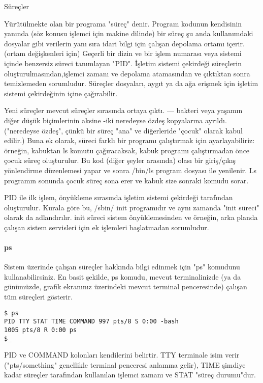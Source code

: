 \begin{section}{Süreçler}

Yürütülmekte olan bir programa "süreç" denir. Program kodunun kendisinin yanında (söz konusu işlemci için makine dilinde) bir süreç şu anda kullanımdaki dosyalar gibi verilerin yanı sıra idari bilgi için çalışan depolama ortamı içerir. (ortam değişkenleri için) Geçerli bir dizin ve bir işlem numarası veya sistemi içinde benzersiz süreci tanımlayan "PID". İşletim sistemi çekirdeği süreçlerin oluşturulmasından,işlemci zamanı ve  depolama atamasından ve çıktıktan sonra temizlemeden sorumludur. Süreçler dosyaları, aygıt ya da ağa erişmek için işletim sistemi çekirdeğinin içine çağırabilir.

Yeni süreçler mevcut süreçler sırasında ortaya çıktı. — bakteri veya yaşamın diğer düşük biçimlerinin aksine -iki neredeyse özdeş kopyalarına ayrıldı. ("neredeyse özdeş", çünkü bir süreç "ana" ve diğerleride "çocuk" olarak kabul edilir.) Buna ek olarak, süreci farklı bir programı çalıştırmak için ayarlayabiliriz: örneğin, kabuktan ls komutu çağıracaksak, kabuk programı çalıştırmadan önce çocuk süreç oluşturulur. Bu kod (diğer şeyler arasında) olası bir giriş/çıkış yönlendirme düzenlemesi yapar ve sonra /bin/ls program dosyası ile yenilenir. Ls programın sonunda çocuk süreç sona erer ve kabuk size sonraki komudu sorar.

PID ile ilk işlem, önyükleme sırasında işletim sistemi çekirdeği tarafından oluşturulur. Kurala göre bu, /sbin/ init  programıdır ve aynı zamanda "init süreci" olarak da adlandırılır. init süreci sistem önyüklemesinden ve örneğin, arka planda çalışan sistem servisleri için ek işlemleri başlatmadan sorumludur.

\paragraph{ps}{Sistem üzerinde çalışan süreçler hakkında bilgi edinmek için "ps" komudunu kullanabilirsiniz. En basit şekilde, ps komudu, mevcut terminalinizde (ya da günümüzde, grafik ekranınız üzerindeki mevcut terminal penceresinde) çalışan tüm süreçleri gösterir.}

\begin{verbatim}
$ ps
PID TTY STAT TIME COMMAND 997 pts/8 S 0:00 -bash
1005 pts/8 R 0:00 ps 
$_
\end{verbatim}

PID ve COMMAND kolonları kendilerini belirtir. TTY terminale isim verir ("pts/something" genellikle terminal penceresi anlamına gelir), TIME şimdiye kadar süreçler tarafından kullanılan işlemci zamanı  ve STAT "süreç durumu"dur. 


\end{section}
